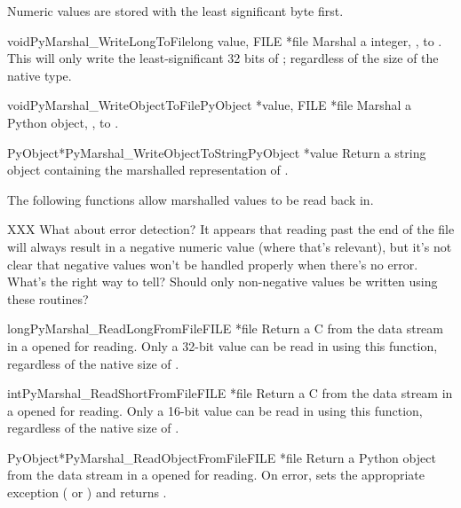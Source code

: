 Numeric values are stored with the least significant byte first.

\begin{cfuncdesc}{void}{PyMarshal_WriteLongToFile}{long value, FILE *file}
  Marshal a  integer, , to .  This
  will only write the least-significant 32 bits of ;
  regardless of the size of the native  type.
\end{cfuncdesc}

\begin{cfuncdesc}{void}{PyMarshal_WriteObjectToFile}{PyObject *value,
                                                     FILE *file}
  Marshal a Python object, , to .
\end{cfuncdesc}

\begin{cfuncdesc}{PyObject*}{PyMarshal_WriteObjectToString}{PyObject *value}
  Return a string object containing the marshalled representation of
  .
\end{cfuncdesc}

The following functions allow marshalled values to be read back in.

XXX What about error detection?  It appears that reading past the end
of the file will always result in a negative numeric value (where
that's relevant), but it's not clear that negative values won't be
handled properly when there's no error.  What's the right way to tell?
Should only non-negative values be written using these routines?

\begin{cfuncdesc}{long}{PyMarshal_ReadLongFromFile}{FILE *file}
  Return a C  from the data stream in a 
  opened for reading.  Only a 32-bit value can be read in using
  this function, regardless of the native size of .
\end{cfuncdesc}

\begin{cfuncdesc}{int}{PyMarshal_ReadShortFromFile}{FILE *file}
  Return a C  from the data stream in a 
  opened for reading.  Only a 16-bit value can be read in using
  this function, regardless of the native size of .
\end{cfuncdesc}

\begin{cfuncdesc}{PyObject*}{PyMarshal_ReadObjectFromFile}{FILE *file}
  Return a Python object from the data stream in a 
  opened for reading.  On error, sets the appropriate exception
  ( or ) and returns \NULL.
\end{cfuncdesc}

